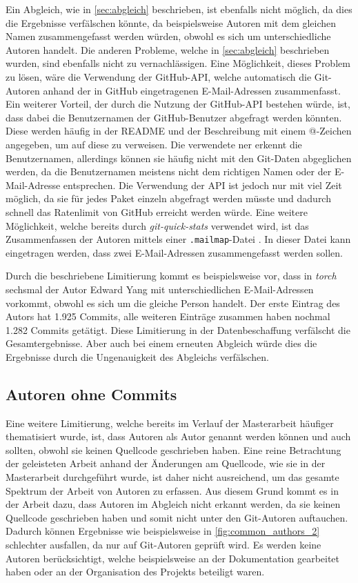 Ein Abgleich, wie in \autoref{sec:abgleich} beschrieben, ist ebenfalls nicht möglich, da dies die Ergebnisse verfälschen könnte, da beispielsweise Autoren mit dem gleichen Namen zusammengefasst werden würden, obwohl es sich um unterschiedliche Autoren handelt.
Die anderen Probleme, welche in \autoref{sec:abgleich} beschrieben wurden, sind ebenfalls nicht zu vernachlässigen.
Eine Möglichkeit, dieses Problem zu lösen, wäre die Verwendung der GitHub-API, welche automatisch die Git-Autoren anhand der in GitHub eingetragenen E-Mail-Adressen zusammenfasst.
Ein weiterer Vorteil, der durch die Nutzung der GitHub-API bestehen würde, ist, dass dabei die Benutzernamen der GitHub-Benutzer abgefragt werden könnten.
Diese werden häufig in der README und der Beschreibung mit einem @-Zeichen angegeben, um auf diese zu verweisen.
Die verwendete \gls{ner} erkennt die Benutzernamen, allerdings können sie häufig nicht mit den Git-Daten abgeglichen werden, da die Benutzernamen meistens nicht dem richtigen Namen oder der E-Mail-Adresse entsprechen.
Die Verwendung der API ist jedoch nur mit viel Zeit möglich, da sie für jedes Paket einzeln abgefragt werden müsste und dadurch schnell das Ratenlimit von GitHub erreicht werden würde.
Eine weitere Möglichkeit, welche bereits durch \emph{git-quick-stats} verwendet wird, ist das Zusammenfassen der Autoren mittels einer \texttt{.mailmap}-Datei \autocite{chacon_git_2024-1}.
In dieser Datei kann eingetragen werden, dass zwei E-Mail-Adressen zusammengefasst werden sollen.

Durch die beschriebene Limitierung kommt es beispielsweise vor, dass in \emph{torch} sechsmal der Autor \glqq Edward Yang\grqq{} mit unterschiedlichen E-Mail-Adressen vorkommt, obwohl es sich um die gleiche Person handelt.
Der erste Eintrag des Autors hat 1.925 Commits, alle weiteren Einträge zusammen haben nochmal 1.282 Commits getätigt.
Diese Limitierung in der Datenbeschaffung verfälscht die Gesamtergebnisse.
Aber auch bei einem erneuten Abgleich würde dies die Ergebnisse durch die Ungenauigkeit des Abgleichs verfälschen.

\subsection*{Autoren ohne Commits}
\label{sec:autoren_ohne_commits}
Eine weitere Limitierung, welche bereits im Verlauf der Masterarbeit häufiger thematisiert wurde, ist, dass Autoren als Autor genannt werden können und auch sollten, obwohl sie keinen Quellcode geschrieben haben.
Eine reine Betrachtung der geleisteten Arbeit anhand der Änderungen am Quellcode, wie sie in der Masterarbeit durchgeführt wurde, ist daher nicht ausreichend, um das gesamte Spektrum der Arbeit von Autoren zu erfassen.
Aus diesem Grund kommt es in der Arbeit dazu, dass Autoren im Abgleich nicht erkannt werden, da sie keinen Quellcode geschrieben haben und somit nicht unter den Git-Autoren auftauchen.
Dadurch können Ergebnisse wie beispielsweise in \autoref{fig:common_authors_2} schlechter ausfallen, da nur auf Git-Autoren geprüft wird.
Es werden keine Autoren berücksichtigt, welche beispielsweise an der Dokumentation gearbeitet haben oder an der Organisation des Projekts beteiligt waren.

